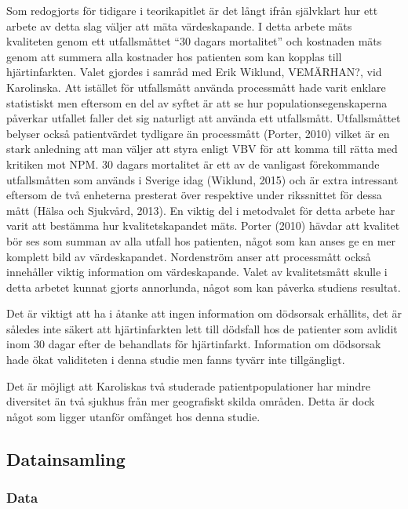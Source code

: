 Som redogjorts för tidigare i teorikapitlet är det långt ifrån självklart hur ett arbete av detta slag väljer att mäta värdeskapande. I detta arbete mäts kvaliteten genom ett utfallsmåttet “30 dagars mortalitet” och kostnaden mäts genom att summera alla kostnader hos patienten som kan kopplas till hjärtinfarkten. Valet gjordes i samråd med Erik Wiklund, VEMÄRHAN?, vid Karolinska. Att istället för utfallsmått använda processmått hade varit enklare statistiskt men eftersom en del av syftet är att se hur populationsegenskaperna påverkar utfallet faller det sig naturligt att använda ett utfallsmått. Utfallsmåttet belyser också patientvärdet tydligare än processmått (Porter, 2010) vilket är en stark anledning att man väljer att styra enligt VBV för att komma till rätta med kritiken mot NPM. 30 dagars mortalitet är ett av de vanligast förekommande utfallsmåtten som används i Sverige idag (Wiklund, 2015) och är extra intressant eftersom de två enheterna presterat över respektive under rikssnittet för dessa mått (Hälsa och Sjukvård, 2013). En viktig del i metodvalet för detta arbete har varit att bestämma hur kvalitetskapandet mäts. Porter (2010) hävdar att kvalitet bör ses som summan av alla utfall hos patienten, något som kan anses ge en mer komplett bild av värdeskapandet. Nordenström anser att processmått också innehåller viktig information om värdeskapande. Valet av kvalitetsmått skulle i detta arbetet kunnat gjorts annorlunda, något som kan påverka studiens resultat.

Det är viktigt att ha i åtanke att ingen information om dödsorsak erhållits, det är således inte säkert att hjärtinfarkten lett till dödsfall hos de patienter som avlidit inom 30 dagar efter de behandlats för hjärtinfarkt. Information om dödsorsak hade ökat validiteten i denna studie men fanns tyvärr inte tillgängligt.

Det är möjligt att Karoliskas två studerade patientpopulationer har mindre diversitet än två sjukhus från mer geografiskt skilda områden. Detta är dock något som ligger utanför omfånget hos denna studie.

\subsection{Datainsamling}

\subsubsection{Data}

